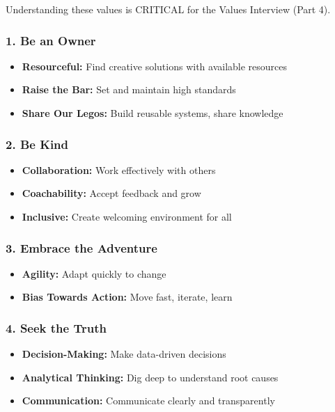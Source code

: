 \documentclass[11pt,letterpaper]{article}
\begin{document}
Understanding these values is CRITICAL for the Values Interview (Part 4).

\subsubsection{1. Be an Owner}
\begin{itemize}
    \item \textbf{Resourceful:} Find creative solutions with available resources
    \item \textbf{Raise the Bar:} Set and maintain high standards
    \item \textbf{Share Our Legos:} Build reusable systems, share knowledge
\end{itemize}

\subsubsection{2. Be Kind}
\begin{itemize}
    \item \textbf{Collaboration:} Work effectively with others
    \item \textbf{Coachability:} Accept feedback and grow
    \item \textbf{Inclusive:} Create welcoming environment for all
\end{itemize}

\subsubsection{3. Embrace the Adventure}
\begin{itemize}
    \item \textbf{Agility:} Adapt quickly to change
    \item \textbf{Bias Towards Action:} Move fast, iterate, learn
\end{itemize}

\subsubsection{4. Seek the Truth}
\begin{itemize}
    \item \textbf{Decision-Making:} Make data-driven decisions
    \item \textbf{Analytical Thinking:} Dig deep to understand root causes
    \item \textbf{Communication:} Communicate clearly and transparently
\end{itemize}
\end{document}
